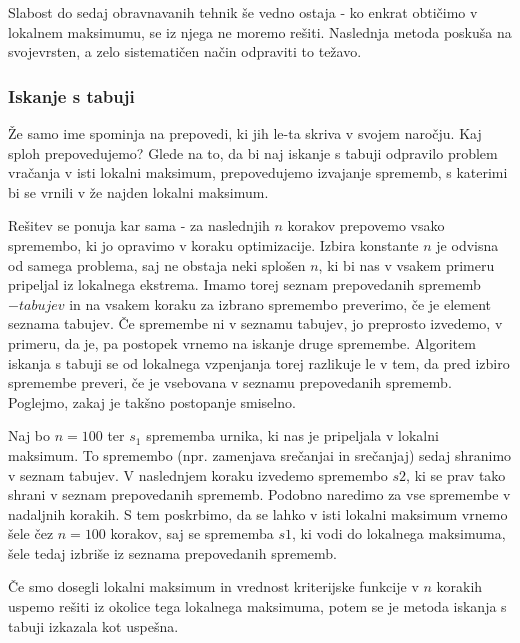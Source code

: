 \documentclass[a4paper,10pt]{article}
\begin{document}
Slabost do sedaj obravnavanih tehnik še vedno ostaja - ko enkrat obtičimo v lokalnem
maksimumu, se iz njega ne moremo rešiti. Naslednja metoda poskuša na svojevrsten, a zelo
sistematičen način odpraviti to težavo.
\subsubsection{Iskanje s tabuji}
Že samo ime spominja na prepovedi, ki jih le-ta skriva v svojem naročju. Kaj sploh prepovedujemo?
Glede na to, da bi naj iskanje s tabuji odpravilo problem vračanja v isti lokalni maksimum,
prepovedujemo izvajanje sprememb, s katerimi bi se vrnili v že najden lokalni maksimum.

Rešitev se ponuja kar sama - za naslednjih $n$ korakov prepovemo vsako spremembo, ki jo
opravimo v koraku optimizacije. Izbira konstante $n$ je odvisna od samega problema, saj
ne obstaja neki splošen $n$, ki bi nas v vsakem primeru pripeljal iz lokalnega ekstrema.
Imamo torej seznam prepovedanih sprememb $-tabujev$ in na vsakem koraku za izbrano
spremembo preverimo, če je element seznama tabujev. Če spremembe ni v seznamu tabujev, jo
preprosto izvedemo, v primeru, da je, pa postopek vrnemo na iskanje druge spremembe.
Algoritem iskanja s tabuji se od lokalnega vzpenjanja torej razlikuje le v tem, da pred
izbiro spremembe preveri, če je vsebovana v seznamu prepovedanih sprememb. Poglejmo, zakaj
je takšno postopanje smiselno.

Naj bo $n=100$ ter $s_1$ sprememba urnika, ki nas je pripeljala v lokalni maksimum. To
spremembo (npr. zamenjava srečanjai in srečanjaj) sedaj shranimo v
seznam tabujev. V naslednjem koraku izvedemo spremembo $s2$, ki se prav tako shrani v
seznam prepovedanih sprememb. Podobno naredimo za vse spremembe v nadaljnih korakih. S
tem poskrbimo, da se lahko v isti lokalni maksimum vrnemo šele čez $n=100$ korakov, saj
se sprememba $s1$, ki vodi do lokalnega maksimuma, šele tedaj izbriše iz seznama
prepovedanih sprememb.

Če smo dosegli lokalni maksimum in vrednost kriterijske funkcije v $n$ korakih uspemo
rešiti iz okolice tega lokalnega maksimuma, potem se je metoda iskanja s tabuji izkazala
kot uspešna.
\end{document}
